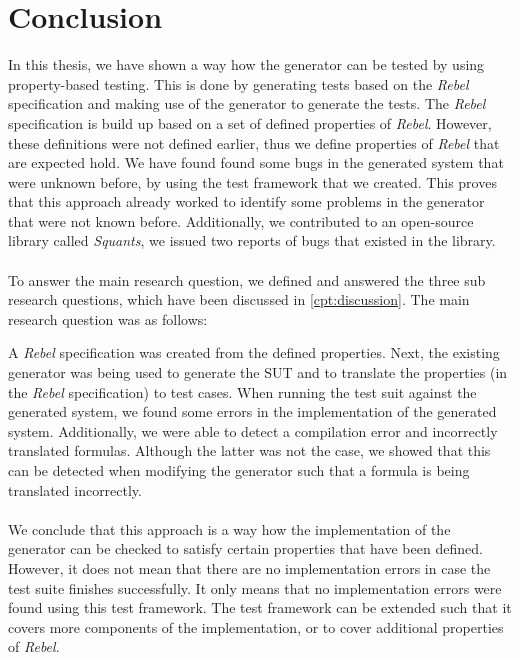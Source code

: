 \chapter{Conclusion}
\label{chp:conclusion}
In this thesis, we have shown a way how the generator can be tested by using property-based testing. This is done by generating tests based on the \textit{Rebel} specification and making use of the generator to generate the tests. The \textit{Rebel} specification is build up based on a set of defined properties of \textit{Rebel}. However, these definitions were not defined earlier, thus we define properties of \textit{Rebel} that are expected hold. We have found found some bugs in the generated system that were unknown before, by using the test framework that we created. This proves that this approach already worked to identify some problems in the generator that were not known before. Additionally, we contributed to an open-source library called \textit{Squants}, we issued two reports of bugs that existed in the library.\\
\\
To answer the main research question, we defined and answered the three sub research questions, which have been discussed in \autoref{cpt:discussion}. The main research question was as follows:
\begin{quote}
\rqMain
\end{quote}
A \textit{Rebel} specification was created from the defined properties. Next, the existing generator was being used to generate the SUT and to translate the properties (in the \textit{Rebel} specification) to test cases. When running the test suit against the generated system, we found some errors in the implementation of the generated system. Additionally, we were able to detect a compilation error and incorrectly translated formulas. Although the latter was not the case, we showed that this can be detected when modifying the generator such that a formula is being translated incorrectly.\\
\\
We conclude that this approach is a way how the implementation of the generator can be checked to satisfy certain properties that have been defined. However, it does not mean that there are no implementation errors in case the test suite finishes successfully. It only means that no implementation errors were found using this test framework. The test framework can be extended such that it covers more components of the implementation, or to cover additional properties of \textit{Rebel}.

